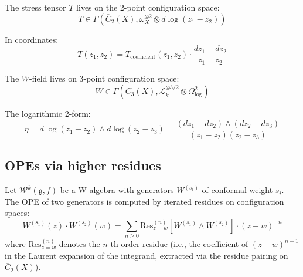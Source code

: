 \begin{example}
The stress tensor $T$ lives on the 2-point configuration space:
\begin{equation}
T \in \Gamma(\overline{C}_2(X), \omega_X^{\otimes 2} \otimes d\log(z_1-z_2))
\end{equation}

In coordinates:
\begin{equation}
T(z_1, z_2) = T_{\text{coefficient}}(z_1, z_2) \cdot \frac{dz_1 - dz_2}{z_1 - z_2}
\end{equation}
\end{example}

\begin{example}
The $W$-field lives on 3-point configuration space:
\begin{equation}
W \in \Gamma(\overline{C}_3(X), \mathcal{L}_k^{\otimes 3/2} \otimes \Omega^2_{\log})
\end{equation}

The logarithmic 2-form:
\begin{equation}
\eta = d\log(z_1-z_2) \wedge d\log(z_2-z_3) = \frac{(dz_1-dz_2) \wedge (dz_2-dz_3)}{(z_1-z_2)(z_2-z_3)}
\end{equation}
\end{example}

\subsection{OPEs via higher residues}

\begin{theorem}\label{thm:w-geometric-ope}
Let $\mathcal{W}^k(\mathfrak{g},f)$ be a W-algebra with generators $W^{(s_i)}$ of conformal weight $s_i$.  The OPE of two generators is computed by iterated residues on configuration spaces:
\begin{equation}
W^{(s_1)}(z) \cdot W^{(s_2)}(w) = \sum_{n \geq 0} \mathrm{Res}^{(n)}_{z=w}\!\left[W^{(s_1)} \wedge W^{(s_2)}\right] \cdot (z-w)^{-n}
\end{equation}
where $\mathrm{Res}^{(n)}_{z=w}$ denotes the $n$-th order residue (i.e., the coefficient of $(z-w)^{n-1}$ in the Laurent expansion of the integrand, extracted via the residue pairing on $\overline{C}_2(X)$).
\end{theorem}

